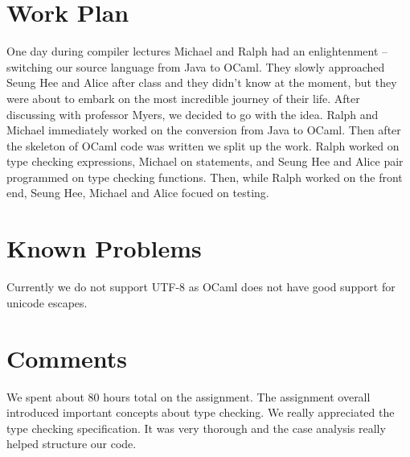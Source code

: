 \documentclass{hw}
\begin{document}
\section{Work Plan}\label{sec:workplan}
One day during compiler lectures Michael and Ralph had an enlightenment -- switching our
source language from Java to OCaml.
They slowly approached Seung Hee and Alice after class and they didn't know at the moment, 
but they were about to embark on the most incredible journey of their life. After discussing
with professor Myers, we decided to go with the idea. Ralph and Michael immediately 
worked on the conversion from Java to OCaml. Then after the skeleton of OCaml code was written
we split up the work. Ralph worked on type checking expressions, Michael on statements,
and Seung Hee and Alice pair programmed on type checking functions. Then, while 
Ralph worked on the front end, Seung Hee, Michael and Alice focued on testing.

\section{Known Problems}\label{sec:problems}
Currently we do not support UTF-8 as OCaml does not have good support for unicode 
escapes. 

\section{Comments}\label{sec:comments}
We spent about 80 hours total on the assignment. The assignment overall
introduced important concepts about type checking. We really appreciated 
the type checking specification. It was very thorough and the case analysis
really helped structure our code.
\end{document}
